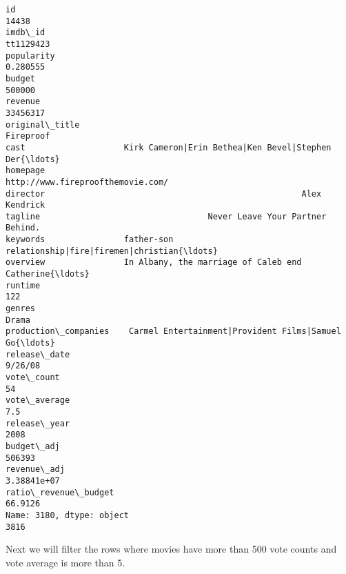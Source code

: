 \documentclass[11pt]{article}
\begin{document}
    \begin{Verbatim}[commandchars=\\\{\}]
id                                                                  14438
imdb\_id                                                         tt1129423
popularity                                                       0.280555
budget                                                             500000
revenue                                                          33456317
original\_title                                                  Fireproof
cast                    Kirk Cameron|Erin Bethea|Ken Bevel|Stephen Der{\ldots}
homepage                                http://www.fireproofthemovie.com/
director                                                    Alex Kendrick
tagline                                  Never Leave Your Partner Behind.
keywords                father-son relationship|fire|firemen|christian{\ldots}
overview                In Albany, the marriage of Caleb end Catherine{\ldots}
runtime                                                               122
genres                                                              Drama
production\_companies    Carmel Entertainment|Provident Films|Samuel Go{\ldots}
release\_date                                                      9/26/08
vote\_count                                                             54
vote\_average                                                          7.5
release\_year                                                         2008
budget\_adj                                                         506393
revenue\_adj                                                   3.38841e+07
ratio\_revenue\_budget                                              66.9126
Name: 3180, dtype: object
3816

    \end{Verbatim}

    Next we will filter the rows where movies have more than 500 vote counts
and vote average is more than 5.
\end{document}
